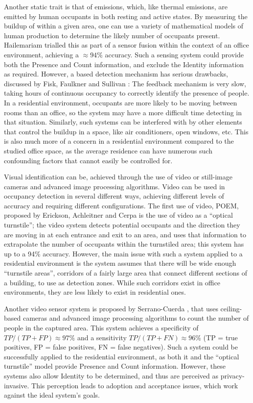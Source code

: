 \documentclass[../thesis/thesis.tex]{subfiles}
\begin{document}
Another static trait is that of \cdi emissions, which, like thermal emissions, are emitted by human occupants in both resting and active states. By measuring the buildup of \cdi within a given area, one can use a variety of mathematical models of human \cdi production to determine the likely number of occupants present. Hailemariam \etal \cite{hailemariam2011real} trialled this as part of a sensor fusion within the context of an office environment, achieving a $\approx94\%$ accuracy. Such a sensing system could provide both the Presence and Count information, and exclude the Identity information as required. However, a \cdi based detection mechanism has serious drawbacks, discussed by Fisk, Faulkner and Sullivan \cite{fisk2006accuracy}: The \cdi feedback mechanism is very slow, taking hours of continuous occupancy to correctly identify the presence of people. In a residential environment, occupants are more likely to be moving between rooms than an office, so the system may have a more difficult time detecting in that situation. Similarly, such systems can be interfered with by other elements that control the \cdi buildup in a space, like air conditioners, open windows, etc. This is also much more of a concern in a residential environment compared to the studied office space, as the average residence can have numerous such confounding factors that cannot easily be controlled for.

Visual identification can be, achieved through the use of video or still-image cameras and advanced image processing algorithms. Video can be used in occupancy detection in several different ways, achieving different levels of accuracy and requiring different configurations. The first use of video, POEM, proposed by Erickson, Achleitner and Cerpa \cite{erickson2013poem} is the use of video as a ``optical turnstile''; the video system detects potential occupants and the direction they are moving in at each entrance and exit to an area, and uses that information to extrapolate the number of occupants within the turnstiled area; this system has up to a 94\% accuracy. However, the main issue with such a system applied to a residential environment is the system assumes that there will be wide enough ``turnstile areas'', corridors of a fairly large area that connect different sections of a building, to use as detection zones. While such corridors exist in office environments, they are less likely to exist in residential ones.

Another video sensor system is proposed by Serrano-Cuerda \etal \cite{serrano2013efficient}, that uses ceiling-based cameras and advanced image processing algorithms to count the number of people in the captured area. This system achieves a specificity of $\mathit{TP}/(\mathit{TP}+\mathit{FP})\approx97\%$ and a sensitivity $\mathit{TP}/(\mathit{TP}+\mathit{FN})\approx96\%$ (TP = true positives, FP = false positives, FN = false negatives). Such a system could be successfully applied to the residential environment, as both it and the ``optical turnstile'' model provide Presence and Count information. However, these systems also allow Identity to be determined, and thus are perceived as privacy-invasive. This perception leads to adoption and acceptance issues, which work against the ideal system's goals.
\end{document}
